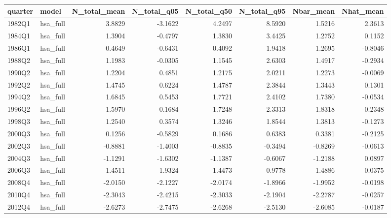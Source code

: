 \begin{tabular}{llrrrrrr}
\toprule
quarter & model & N\_total\_mean & N\_total\_q05 & N\_total\_q50 & N\_total\_q95 & Nbar\_mean & Nhat\_mean \\
\midrule
1982Q1 & hsa\_full & 3.8829 & -3.1622 & 4.2497 & 8.5920 & 1.5216 & 2.3613 \\
1984Q1 & hsa\_full & 1.3904 & -0.4797 & 1.3830 & 3.4425 & 1.2752 & 0.1152 \\
1986Q1 & hsa\_full & 0.4649 & -0.6431 & 0.4092 & 1.9418 & 1.2695 & -0.8046 \\
1988Q2 & hsa\_full & 1.1983 & -0.0305 & 1.1545 & 2.6303 & 1.4917 & -0.2934 \\
1990Q2 & hsa\_full & 1.2204 & 0.4851 & 1.2175 & 2.0211 & 1.2273 & -0.0069 \\
1992Q2 & hsa\_full & 1.4745 & 0.6224 & 1.4787 & 2.3844 & 1.3443 & 0.1301 \\
1994Q2 & hsa\_full & 1.6845 & 0.5453 & 1.7721 & 2.4102 & 1.7380 & -0.0534 \\
1996Q2 & hsa\_full & 1.5970 & 0.1684 & 1.7248 & 2.3313 & 1.8318 & -0.2348 \\
1998Q3 & hsa\_full & 1.2540 & 0.3574 & 1.3246 & 1.8544 & 1.3813 & -0.1273 \\
2000Q3 & hsa\_full & 0.1256 & -0.5829 & 0.1686 & 0.6383 & 0.3381 & -0.2125 \\
2002Q3 & hsa\_full & -0.8881 & -1.4003 & -0.8835 & -0.3494 & -0.8269 & -0.0613 \\
2004Q3 & hsa\_full & -1.1291 & -1.6302 & -1.1387 & -0.6067 & -1.2188 & 0.0897 \\
2006Q3 & hsa\_full & -1.4511 & -1.9324 & -1.4473 & -0.9778 & -1.4886 & 0.0375 \\
2008Q4 & hsa\_full & -2.0150 & -2.1227 & -2.0174 & -1.8966 & -1.9952 & -0.0198 \\
2010Q4 & hsa\_full & -2.3043 & -2.4215 & -2.3033 & -2.1904 & -2.2787 & -0.0257 \\
2012Q4 & hsa\_full & -2.6273 & -2.7475 & -2.6268 & -2.5130 & -2.6085 & -0.0187 \\
\bottomrule
\end{tabular}
